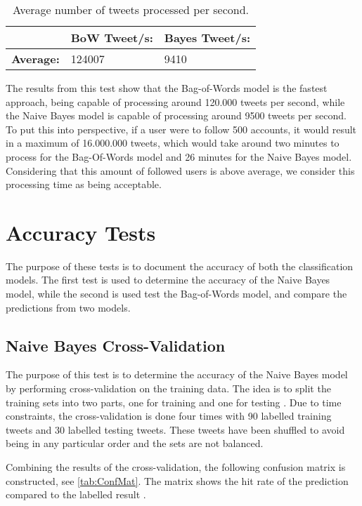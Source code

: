 \begin{table}[H]\centering
\begin{tabular}{|l|l|l|}\hline
					&	\textbf{BoW Tweet/s:}	&	\textbf{Bayes Tweet/s:}	\\\hline
\textbf{Average:}	&	124007				&	9410 					\\\hline	
\end{tabular}
\caption{Average number of tweets processed per second.}
\label{AvgTweetsPs}
\end{table}

The results from this test show that the Bag-of-Words model is the fastest
approach, being capable of processing around 120.000 tweets per second, while
the Naive Bayes model is capable of processing around 9500 tweets per second.
To put this into perspective, if a user were to follow 500 accounts, it would
result in a maximum of 16.000.000 tweets, which would take around two minutes to
process for the Bag-Of-Words model and 26 minutes for the Naive Bayes model.
Considering that this amount of followed users is above average, we consider
this processing time as being acceptable.

\section{Accuracy Tests}\label{sec:accTest}
The purpose of these tests is to document the accuracy of both the
classification models. The first test is used to determine the accuracy of the
Naive Bayes model, while the second is used test the Bag-of-Words model, and
compare the predictions from two models.


\subsection{Naive Bayes Cross-Validation}\label{subsec:NBCV}
The purpose of this test is to determine the accuracy of the Naive Bayes model
by performing cross-validation on the training data. The idea is to split the
training sets into two parts, one for training and one for testing \citep[Ch.
7.5.2]{MIBook}. Due to time constraints, the cross-validation is done four times
with 90 labelled training tweets and 30 labelled testing tweets. These tweets have
been shuffled to avoid being in any particular order and the sets are not
balanced.\nl

Combining the results of the cross-validation, the following confusion
matrix is constructed, see \autoref{tab:ConfMat}. The matrix shows the
hit rate of the prediction compared to the labelled result
\citep{ConfusionMatrix}.

